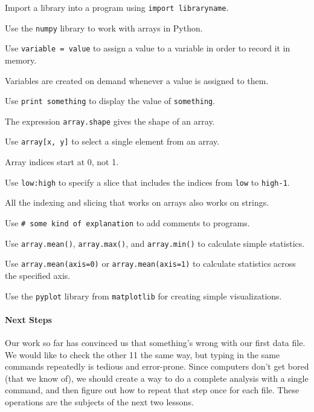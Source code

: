 \documentclass{book}
\begin{document}
\begin{swcitemize}
\item
  Import a library into a program using \texttt{import libraryname}.
\item
  Use the \texttt{numpy} library to work with arrays in Python.
\item
  Use \texttt{variable = value} to assign a value to a variable in order
  to record it in memory.
\item
  Variables are created on demand whenever a value is assigned to them.
\item
  Use \texttt{print something} to display the value of
  \texttt{something}.
\item
  The expression \texttt{array.shape} gives the shape of an array.
\item
  Use \texttt{array{[}x, y{]}} to select a single element from an array.
\item
  Array indices start at 0, not 1.
\item
  Use \texttt{low:high} to specify a slice that includes the indices
  from \texttt{low} to \texttt{high-1}.
\item
  All the indexing and slicing that works on arrays also works on
  strings.
\item
  Use \texttt{\# some kind of explanation} to add comments to programs.
\item
  Use \texttt{array.mean()}, \texttt{array.max()}, and
  \texttt{array.min()} to calculate simple statistics.
\item
  Use \texttt{array.mean(axis=0)} or \texttt{array.mean(axis=1)} to
  calculate statistics across the specified axis.
\item
  Use the \texttt{pyplot} library from \texttt{matplotlib} for creating
  simple visualizations.
\end{swcitemize}

\mbox{}\paragraph{Next Steps}

Our work so far has convinced us that something's wrong with our first
data file. We would like to check the other 11 the same way, but typing
in the same commands repeatedly is tedious and error-prone. Since
computers don't get bored (that we know of), we should create a way to
do a complete analysis with a single command, and then figure out how to
repeat that step once for each file. These operations are the subjects
of the next two lessons.
\end{document}
